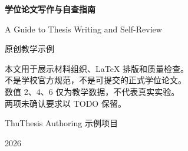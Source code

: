 \documentclass[degree=master,fontset=fandol]{thuthesis}
\begin{document}
\begin{titlepage}
\centering
\vspace*{35mm}
{\bfseries 学位论文写作与自查指南\par}
\vspace{12mm}
{\large A Guide to Thesis Writing and Self-Review\par}
\vspace{20mm}
{ 原创教学示例\par}
\vspace{8mm}
\begin{minipage}{.78\textwidth}
\centering
本文用于展示材料组织、LaTeX 排版和质量检查。\\
不是学校官方规范，不是可提交的正式学位论文。\\
数值 2、4、6 仅为教学数据，不代表真实实验。\\
两项未确认要求以 TODO 保留。
\end{minipage}
\vfill
ThuThesis Authoring 示例项目\par
2026\par
\end{titlepage}
\frontmatter

\tableofcontents
\mainmatter




\end{document}
